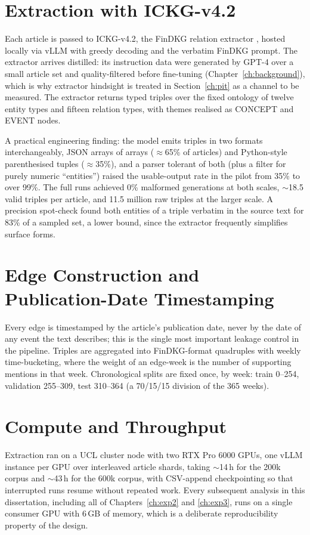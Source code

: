 \documentclass[a4paper,12pt]{report}
\begin{document}
\section{Extraction with ICKG-v4.2}
Each article is passed to ICKG-v4.2, the FinDKG relation extractor
\citep{Li2024FinDKG}, hosted locally via vLLM \citep{Kwon2023vLLM} with greedy
decoding and the verbatim FinDKG prompt. The extractor arrives
distilled: its instruction data were generated by GPT-4 over a small
article set and quality-filtered before fine-tuning
(Chapter~\ref{ch:background}), which is why extractor hindsight is
treated in Section~\ref{ch:pit} as a channel to be measured. The extractor returns typed triples
over the fixed ontology of twelve entity types and fifteen relation types,
with themes realised as CONCEPT and EVENT nodes.

A practical engineering finding: the model emits triples in two formats
interchangeably, JSON arrays of arrays ($\approx$65\% of articles) and
Python-style parenthesised tuples ($\approx$35\%), and a parser tolerant of
both (plus a filter for purely numeric ``entities'') raised the usable-output
rate in the pilot from 35\% to over 99\%. The full runs achieved 0\% malformed
generations at both scales, $\sim$18.5 valid triples per article, and 11.5
million raw triples at the larger scale. A precision spot-check found both
entities of a triple verbatim in the source text for 83\% of a sampled set,
a lower bound, since the extractor frequently simplifies surface forms.

\section{Edge Construction and Publication-Date Timestamping}
Every edge is timestamped by the article's publication date, never by
the date of any event the text describes; this is the single most important
leakage control in the pipeline. Triples are aggregated into FinDKG-format
quadruples with weekly time-bucketing, where the weight of an edge-week is the
number of supporting mentions in that week. Chronological splits are fixed
once, by week: train 0--254, validation 255--309, test 310--364 (a 70/15/15
division of the 365 weeks).

\section{Compute and Throughput}
Extraction ran on a UCL cluster node with two RTX Pro 6000 GPUs, one vLLM
instance per GPU over interleaved article shards, taking $\sim$14\,h for the
200k corpus and $\sim$43\,h for the 600k corpus, with CSV-append checkpointing
so that interrupted runs resume without repeated work. Every subsequent
analysis in this dissertation, including all of Chapters~\ref{ch:exp2} and
\ref{ch:exp3}, runs on a single consumer GPU with 6\,GB of memory, which is
a deliberate reproducibility property of the design.
\end{document}
